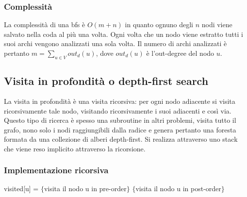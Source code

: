 \subsubsection{Complessit\`a}
La complessit\`a di una bfs \`e $O(m+n)$ in quanto ognuno degli $n$ nodi viene salvato nella coda al pi\`u una volta. Ogni volta che un nodo viene estratto
tutti i suoi archi vengono analizzati una sola volta. Il numero di archi analizzati \`e pertanto $m=\sum\limits_{u\in V}out_d(u)$, dove $out_d(u)$ \`e 
l'out-degree del nodo $u$. 
\subsection{Visita in profondit\`a o depth-first search}
La visita in profondit\`a \`e una visita ricorsiva: per ogni nodo adiacente si visita ricorsivamente tale nodo, visitando ricorsivamente i suoi adiacenti
e cos\`i via. Questo tipo di ricerca \`e spesso una subroutine in altri problemi, visita tutto il grafo, nono solo i nodi raggiungibili dalla radice e
genera pertanto una foresta formata da una collezione di alberi depth-first. Si realizza attraverso uno stack che viene reso implicito attraverso la 
ricorsione.
\subsubsection{Implementazione ricorsiva}
\begin{algorithm}
\DontPrintSemicolon
{}
\caption{\protect{}}
visited[u] = \True\;
$\{$visita il nodo u in pre-order$\}$\;
$\{$visita il nodo u in post-order$\}$\;
\end{algorithm}
